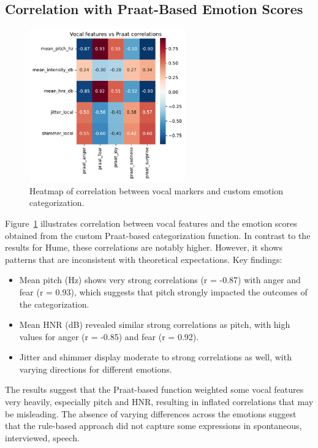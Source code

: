 \subsection{Correlation with Praat-Based Emotion Scores}

\begin{figure}[H]
    \centering
    \includegraphics[width=0.6\textwidth]{png/results/rq1/vocal_features_vs_praat_correlations.pdf}
    \caption{Heatmap of correlation between vocal markers and custom emotion categorization.}
    \label{fig:heatmap-voc-praat}
\end{figure}
Figure~\ref{fig:heatmap-voc-praat} illustrates correlation between vocal features and the emotion scores obtained from the custom Praat-based categorization function. In contrast to the results for Hume, these correlations are notably higher. However, it shows patterns that are inconsistent with theoretical expectations. 
\medskip
Key findings: 
\begin{itemize}
    \item Mean pitch (Hz) shows very strong correlations (r = -0.87) with anger and fear (r = 0.93), which suggests that pitch strongly impacted the outcomes of the categorization. 
    \item Mean HNR (dB) revealed similar strong correlations as pitch, with high values for anger (r = -0.85) and fear (r = 0.92). 
    \item Jitter and shimmer display moderate to strong correlations as well, with varying directions for different emotions. 
\end{itemize}
The results suggest that the Praat-based function weighted some vocal features very heavily, especially pitch and HNR, resulting in inflated correlations that may be misleading. The absence of varying differences across the emotions suggest that the rule-based approach did not capture some expressions in spontaneous, interviewed, speech. 

